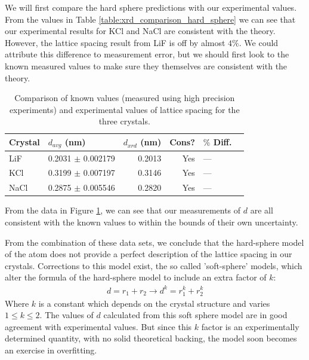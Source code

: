 \documentclass[%
 reprint,
 amsmath,amssymb,
 aps,
 pra,
]{revtex4-1}
\begin{document}
We will first compare the hard sphere predictions with our experimental values. From the values in Table \ref{table:xrd_comparison_hard_sphere} we can see that our experimental results for KCl and NaCl are consistent with the theory. However, the lattice spacing result from LiF is off by almost $4\%$. We could attribute this difference to measurement error, but we should first look to the known measured values to make sure they themselves are consistent with the theory.

\begin{table}[htbp]
	\begin{center}
	\begin{tabular}{|l|r|r|r|l|l|}
		\hline
		Crystal & \multicolumn{1}{l|}{$d_{avg}$ (nm)} & \multicolumn{1}{l|}{$d_{xrd}$ (nm)} & Cons? & $\%$ Diff. \\ \hline
		LiF & 0.2031 $\pm$ 0.002179 & 0.2013 & Yes & --- \\ \hline
		KCl & 0.3199 $\pm$ 0.007197 & 0.3146 & Yes & --- \\ \hline
		NaCl & 0.2875 $\pm$ 0.005546 & 0.2820 & Yes & --- \\ \hline
	\end{tabular}
	\end{center}
	\caption{Comparison of known values (measured using high precision experiments) and experimental values of lattice spacing for the three crystals.}
	\label{table:xrd_comparison_known}
\end{table}

From the data in Figure \ref{table:xrd_comparison_known}, we can see that our measurements of $d$ are all consistent with the known values to within the bounds of their own uncertainty. 

From the combination of these data sets, we conclude that the hard-sphere model of the atom does not provide a perfect description of the lattice spacing in our crystals. Corrections to this model exist, the so called 'soft-sphere' models\cite{soft_sphere}, which alter the formula of the hard-sphere model to include an extra factor of $k$:
\begin{gather}
	d = r_1 + r_2 \rightarrow d^k = r_1^k + r_2^k \nonumber
\end{gather}
Where $k$ is a constant which depends on the crystal structure and varies $1 \le k \le 2$. The values of $d$ calculated from this soft sphere model are in good agreement with experimental values. But since this $k$ factor is an experimentally determined quantity, with no solid theoretical backing, the model soon becomes an exercise in overfitting.
\end{document}

